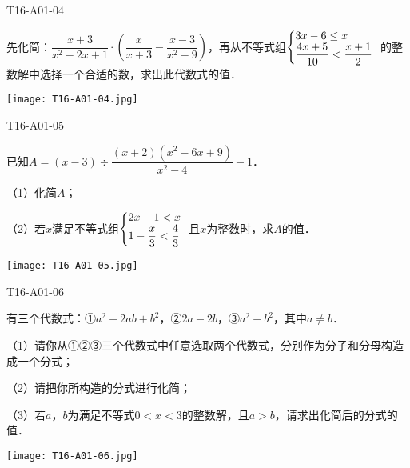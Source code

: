 \begin{defproblem}{T16-A01-04}%
\begin{onlyproblem}%
先化简：$\dfrac{x+3}{x^2-2x+1}\cdot\left(\dfrac{x}{x+3}-\dfrac{x-3}{x^2-9}\right)$，再从不等式组$\left\{\begin{array}{@{}l}
3x-6\le x\\
\dfrac{4x+5}{10}<\dfrac{x+1}{2}\\
\end{array}\right.$的整数解中选择一个合适的数，求出此代数式的值．
\end{onlyproblem}%
\begin{onlysolution}%
\begin{center}
\texttt{[image: T16-A01-04.jpg]}
\end{center}
\end{onlysolution}%
\end{defproblem}


\begin{defproblem}{T16-A01-05}%
\begin{onlyproblem}%
已知$A=(x-3)\div \dfrac{(x+2)(x^2-6x+9)}{x^2-4}-1$．

（1）化简$A$；

（2）若$x$满足不等式组$\left\{\begin{array}{@{}l}
 2x-1<x\\
 1-\dfrac{x}{3}<\dfrac{4}{3}\\
 \end{array}\right.$且$x$为整数时，求$A$的值．
\end{onlyproblem}%
\begin{onlysolution}%
\begin{center}
\texttt{[image: T16-A01-05.jpg]}
\end{center}
\end{onlysolution}%
\end{defproblem}


\begin{defproblem}{T16-A01-06}%
\begin{onlyproblem}%
有三个代数式：①$a^{2}-2ab+b^{2}$，②$2a-2b$，③$a^{2}-b^{2}$，其中$a\neq b$．


（1）请你从①②③三个代数式中任意选取两个代数式，分别作为分子和分母构造成一个分式；

（2）请把你所构造的分式进行化简；

（3）若$a$，$b$为满足不等式$0<x<3$的整数解，且$a>b$，请求出化简后的分式的值．

\end{onlyproblem}%
\begin{onlysolution}%
\begin{center}
\texttt{[image: T16-A01-06.jpg]}
\end{center}
\end{onlysolution}%
\end{defproblem}



